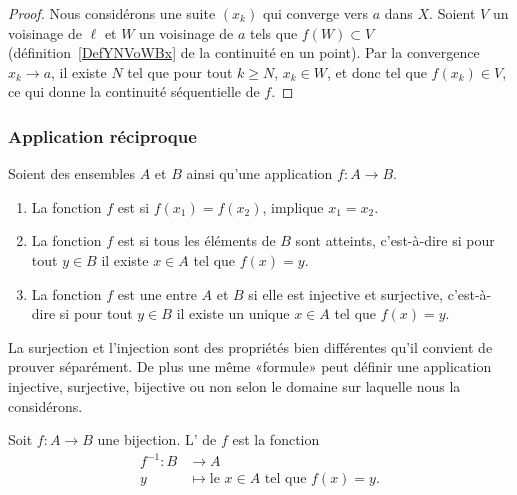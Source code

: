 \begin{proof}
	Nous considérons une suite \( (x_k)\) qui converge vers \( a\) dans \( X\). Soient \( V\) un voisinage de \( \ell \) et \( W\) un voisinage de \( a\) tels que \( f(W)\subset V\) (définition~\ref{DefYNVoWBx} de la continuité en un point). Par la convergence \( x_k\to a\),  il existe \( N\) tel que pour tout \( k\geq N\), \( x_k\in W\), et donc tel que \( f(x_k)\in V\), ce qui donne la continuité séquentielle de \( f\).
\end{proof}


\subsubsection{Application réciproque}

\begin{definition}        \label{DEFooBFCQooPyKvRK}
	Soient des ensembles \( A\) et \( B\) ainsi qu'une application \( f\colon A\to B\).
	\begin{enumerate}
		\item
		      La fonction \( f\) est  si \( f(x_1)=f(x_2)\), implique \( x_1=x_2\).
		\item
		      La fonction \( f\) est  si tous les éléments de \( B\) sont atteints, c'est-à-dire si pour tout \( y\in B\) il existe \( x\in A\) tel que \( f(x)=y\).
		\item
		      La fonction \( f\) est une  entre \( A\) et \( B\) si elle est injective et surjective, c'est-à-dire si pour tout \( y\in B\) il existe un unique \( x\in A\) tel que \( f(x)=y\).
	\end{enumerate}
\end{definition}
La surjection et l'injection sont des propriétés bien différentes qu'il convient de prouver séparément. De plus une même «formule» peut définir une application injective, surjective, bijective ou non selon le domaine sur laquelle nous la considérons.

\begin{definition}      \label{DEFooTRGYooRxORpY}
	Soit \( f\colon A\to B\) une bijection. L' de \( f\) est la fonction
	\begin{equation}
		\begin{aligned}
			f^{-1}\colon B & \to A                                             \\
			y              & \mapsto \text{le } x\in A\text{ tel que } f(x)=y.
		\end{aligned}
	\end{equation}
\end{definition}

